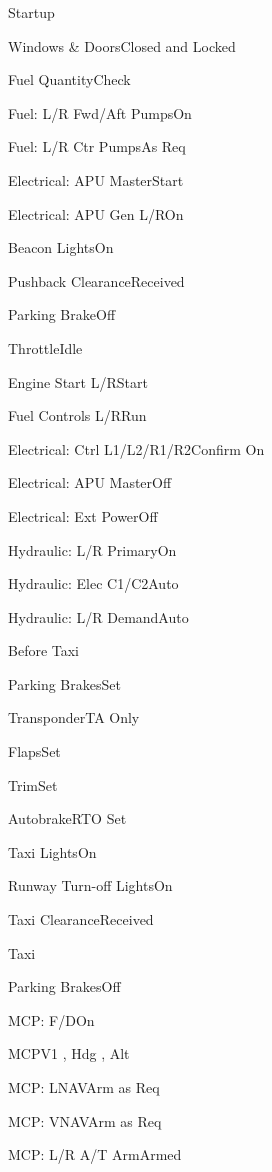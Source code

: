 \documentclass[sim-use]{checklist}
\begin{document}
\begin{checklist}{Startup}
  \item{Windows \& Doors}{Closed and Locked}
  \item{Fuel Quantity}{Check}
  \item{Fuel: L/R Fwd/Aft Pumps}{On}
  \item{Fuel: L/R Ctr Pumps}{As Req}
  \item{Electrical: APU Master}{Start}
  \item{Electrical: APU Gen L/R}{On}
  \item{Beacon Lights}{On}
  \item{Pushback Clearance}{Received}
  \item{Parking Brake}{Off}
  \item{Throttle}{Idle}
  \item{Engine Start L/R}{Start}
  \item{Fuel Controls L/R}{Run}
  \item{Electrical: Ctrl L1/L2/R1/R2}{Confirm On}
  \item{Electrical: APU Master}{Off}
  \item{Electrical: Ext Power}{Off}
  \item{Hydraulic: L/R Primary}{On}
  \item{Hydraulic: Elec C1/C2}{Auto}
  \item{Hydraulic: L/R Demand}{Auto}
\end{checklist}

\begin{checklist}{Before Taxi}
  \item{Parking Brakes}{Set}
  \item{Transponder}{TA Only}
  \item{Flaps}{Set}
  \item{Trim}{Set}
  \item{Autobrake}{RTO Set}
  \item{Taxi Lights}{On}
  \item{Runway Turn-off Lights}{On}
  \item{Taxi Clearance}{Received}
\end{checklist}

\begin{checklist}{Taxi}
  \item{Parking Brakes}{Off}
  \item{MCP: F/D}{On}
  \item{MCP}{V1 \blank, Hdg \blank, Alt \blank}
  \item{MCP: LNAV}{Arm as Req}
  \item{MCP: VNAV}{Arm as Req}
  \item{MCP: L/R A/T Arm}{Armed}
\end{checklist}
\end{document}
